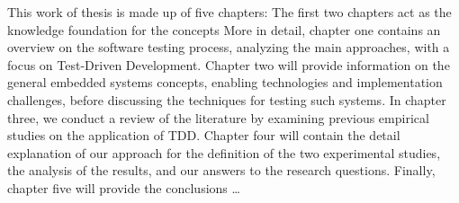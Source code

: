 This work of thesis is made up of five chapters:
The first two chapters act as the knowledge foundation for the concepts 
More in detail, chapter one contains an overview on the software testing process, analyzing the main approaches, with a focus on Test-Driven Development.
Chapter two will provide information on the general embedded systems concepts, enabling technologies and implementation challenges, before discussing the techniques for testing such systems.
In chapter three, we conduct a review of the literature by examining previous empirical studies on the application of TDD.
Chapter four will contain the detail explanation of our approach for the definition of the two experimental studies, the analysis of the results, and our answers to the research questions.
Finally, chapter five will provide the conclusions \dots